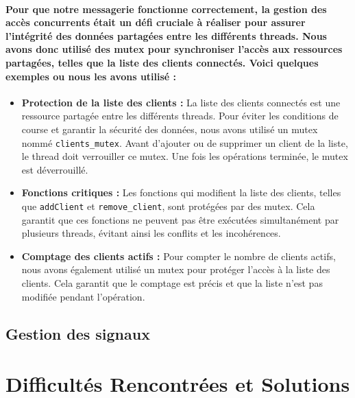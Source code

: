 \documentclass[utf8]{article}
\begin{document}
\paragraph{Pour que notre messagerie fonctionne correctement, la gestion des accès concurrents était un défi cruciale à réaliser pour assurer 
l'intégrité des données partagées entre les différents threads. Nous avons donc utilisé des mutex pour 
synchroniser l'accès aux ressources partagées, telles que la liste des clients connectés. Voici quelques exemples ou nous les avons utilisé :}
\begin{itemize}
    \item \textbf{Protection de la liste des clients :} La liste des clients connectés est une ressource partagée entre les différents threads. Pour éviter les conditions de course et garantir la sécurité des données, nous avons utilisé un mutex nommé \texttt{clients\_mutex}. Avant d'ajouter ou de supprimer un client de la liste, le thread doit verrouiller ce mutex. Une fois les opérations terminée, le mutex est déverrouillé.
    \item \textbf{Fonctions critiques :} Les fonctions qui modifient la liste des clients, telles que \texttt{addClient} et \texttt{remove\_client}, sont protégées par des mutex. Cela garantit que ces fonctions ne peuvent pas être exécutées simultanément par plusieurs threads, évitant ainsi les conflits et les incohérences.
    \item \textbf{Comptage des clients actifs :} Pour compter le nombre de clients actifs, nous avons également utilisé un mutex pour protéger l'accès à la liste des clients. Cela garantit que le comptage est précis et que la liste n'est pas modifiée pendant l'opération.
\end{itemize}

\subsection{Gestion des signaux}
\paragraph{}

\section{Difficultés Rencontrées et Solutions}
\paragraph{}
\end{document}
